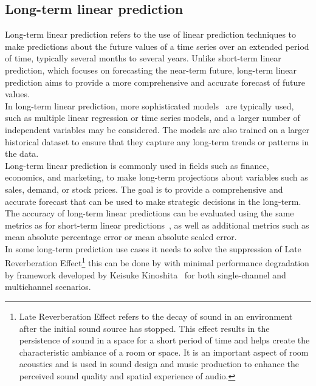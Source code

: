     \subsection{Long-term linear prediction} \label{sec:longlp}
    Long-term linear prediction refers to the use of linear prediction techniques to make predictions about the future values of a time series
    over an extended period of time, typically several months to several years. Unlike short-term linear prediction, which focuses on forecasting the
    near-term future, long-term linear prediction aims to provide a more comprehensive and accurate forecast of future values.
    \\
    In long-term linear prediction, more sophisticated models~\cite{Nave} are typically used, such as multiple linear regression or time series models, and a larger
    number of independent variables may be considered. The models are also trained on a larger historical dataset to ensure that they capture any
    long-term trends or patterns in the data.
    \\
    Long-term linear prediction is commonly used in fields such as finance, economics, and marketing, to make long-term projections about variables
    such as sales, demand, or stock prices. The goal is to provide a comprehensive and accurate forecast that can be used to make strategic
    decisions in the long-term. The accuracy of long-term linear predictions can be evaluated using the same metrics as for short-term linear
    predictions~\cite{Baker}, as well as additional metrics such as mean absolute percentage error or mean absolute scaled error.
    \\
    In some long-term prediction use cases it needs to solve the suppression of Late Reverberation Effect\footnote{Late Reverberation Effect
    refers to the decay of sound in an environment after the initial sound source has stopped. This effect results in the persistence of
    sound in a space for a short period of time and helps create the characteristic ambiance of a room or space.
    It is an important aspect of room acoustics and is used in sound design and music production to enhance the perceived sound
    quality and spatial experience of audio.} this can be done by with minimal performance degradation by framework developed by Keisuke
    Kinoshita~\cite{Kinoshita} for both single-channel and multichannel scenarios.
